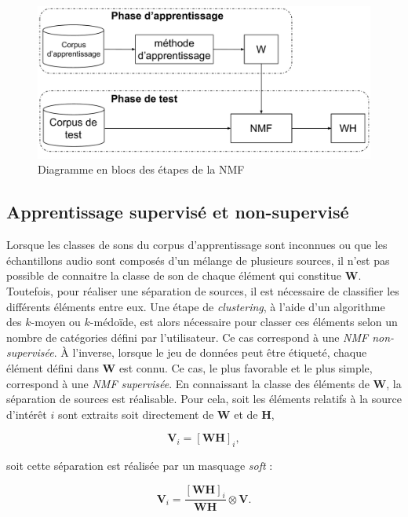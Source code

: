 \begin{figure}[ht]
\centering
\includegraphics[width=.8\linewidth]{./figures/NMF/NMF_apprentissage.pdf}
\caption{Diagramme en blocs des étapes de la NMF}
\label{fig:supervised_learning}
\end{figure}

\subsection{Apprentissage supervisé et non-supervisé}
Lorsque les classes de sons du corpus d'apprentissage sont inconnues ou que les échantillons audio sont composés d'un mélange de plusieurs sources, il n'est pas possible de connaitre la classe de son de chaque élément qui constitue $\mathbf{W}$. Toutefois, pour réaliser une séparation de sources, il est nécessaire de classifier les différents éléments entre eux. Une étape de \textit{clustering}, à l'aide d'un algorithme des $k$-moyen ou $k$-médoïde, est alors nécessaire pour classer ces éléments selon un nombre de catégories défini par l'utilisateur. Ce cas correspond à une \textit{NMF non-supervisée}.
À l'inverse, lorsque le jeu de données peut être étiqueté, chaque élément défini dans $\mathbf{W}$ est connu. Ce cas, le plus favorable et le plus simple, correspond à une \textit{NMF supervisée}.
En connaissant la classe des éléments de $\mathbf{W}$, la séparation de sources est réalisable. Pour cela, soit les éléments relatifs à la source d'intérêt $i$ sont extraits soit directement de $\mathbf{W}$ et de $\mathbf{H}$,

\begin{equation}\label{eq:WH_trafic}
\mathbf{V}_i = \left[\mathbf{WH}\right]_i,
\end{equation}

soit cette séparation est réalisée par un masquage \textit{soft} :

\begin{equation}
\mathbf{V}_i = \frac{\left[\mathbf{WH}\right]_i}{\mathbf{WH}} \otimes \mathbf{V}.
\end{equation}
\\

